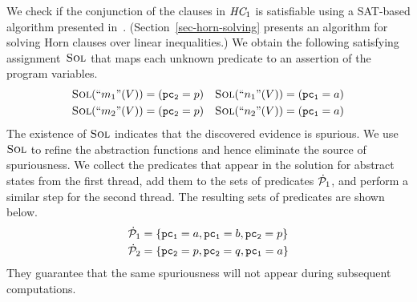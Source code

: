 We check if the conjunction of the clauses in $\textit{HC}_1$ is
satisfiable using a SAT-based algorithm presented
in~\cite{GuptaATVA10}.
(Section~\ref{sec-horn-solving} presents an algorithm for solving Horn
clauses over linear inequalities.)
We obtain the following satisfying assignment~$\textsc{Sol}$ that maps
each unknown predicate to an assertion of the program variables.
%
\begin{equation*}
  \begin{array}[t]{l@{\;=\;}ll@{\;=\;}l}
    \SolutionOf{\unkOf{m_1}(\Vars)} & (\pctwo=p) & 
    \SolutionOf{\unkOf{n_1}(\Vars)} & (\pcone=a)\\[\jot]
    \SolutionOf{\unkOf{m_2}(\Vars)} & (\pctwo=p) & 
    \SolutionOf{\unkOf{n_2}(\Vars)} & (\pcone=a)
  \end{array}
\end{equation*} 
%
The existence of $\textsc{Sol}$ indicates that the discovered evidence is
spurious. 
We use $\textsc{Sol}$ to refine the abstraction functions and hence
eliminate the source of spuriousness.
We collect the predicates that appear in the solution for abstract
states from the first thread, add them to the sets of predicates
$\dot{\mathcal{P}}_1$, and perform a similar step for the second thread.
The resulting sets of predicates are shown below.
%
\begin{equation*}
  \begin{array}[t]{l@{\;=\;}l}
  \artPreds_1 & \set{\pcone=a, \pcone=b, \pctwo=p}\\[\jot]
  \artPreds_2 & \set{\pctwo=p, \pctwo=q, \pcone=a}
  \end{array}
\end{equation*}
%
They guarantee that the same spuriousness will not appear during
subsequent \aret computations.

\iffalse
\todo{Drop?}
We observe that the assignments for $\unkOf{m_1}(\Vars)$ and
$\unkOf{m_2}(\Vars)$ from the first thread involve the local variable
$\pctwo$ of the second thread, and the assignments for
$\unkOf{n_1}(\Vars)$ and $\unkOf{n_2}(\Vars)$ involve the variable
$\pcone\ $. 
While unavoidable for this constraint system, such solutions lead to
non modular reasoning in the next \aret computation.
\fi


